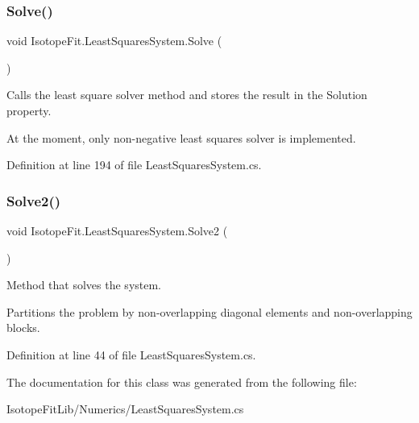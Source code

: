 \subsubsection{\texorpdfstring{Solve()}{Solve()}}
{\footnotesize\ttfamily void Isotope\+Fit.\+Least\+Squares\+System.\+Solve (\begin{DoxyParamCaption}{ }\end{DoxyParamCaption})}



Calls the least square solver method and stores the result in the Solution property. 

At the moment, only non-\/negative least squares solver is implemented. 

Definition at line 194 of file Least\+Squares\+System.\+cs.

\mbox{\label{class_isotope_fit_1_1_least_squares_system_a1066b54298eca0682a56fd0275ae8e46}} 
\subsubsection{\texorpdfstring{Solve2()}{Solve2()}}
{\footnotesize\ttfamily void Isotope\+Fit.\+Least\+Squares\+System.\+Solve2 (\begin{DoxyParamCaption}{ }\end{DoxyParamCaption})}



Method that solves the system. 

Partitions the problem by non-\/overlapping diagonal elements and non-\/overlapping blocks. 

Definition at line 44 of file Least\+Squares\+System.\+cs.



The documentation for this class was generated from the following file\+:\begin{DoxyCompactItemize}
\item 
Isotope\+Fit\+Lib/\+Numerics/Least\+Squares\+System.\+cs\end{DoxyCompactItemize}
